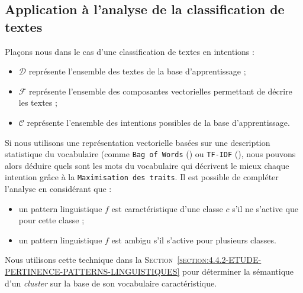 	
	\subsection{Application à l'analyse de la classification de textes}
	\label{annex:C.3.4-DESCRIPTION-IMPLEMENTATION-FEATURES-MAXIMIZATION-METRIC-APPLICATION-TEXTES}
	
		Plaçons nous dans le cas d'une classification de textes en intentions :
		\begin{itemize}
			\item $\mathcal{D}$ représente l'ensemble des textes de la base d'apprentissage ;
			\item $\mathcal{F}$ représente l'ensemble des composantes vectorielles permettant de décrire les textes ;
			\item $\mathcal{C}$ représente l'ensemble des intentions possibles de la base d'apprentissage.
		\end{itemize}
		
		Si nous utilisons une représentation vectorielle basées sur une description statistique du vocabulaire (comme \texttt{Bag of Words} (\cite{harris:1954:distributional-structure}) ou \texttt{TF-IDF} (\cite{ramos:2003:using-tfidf-determine}), nous pouvons alors déduire quels sont les mots du vocabulaire qui décrivent le mieux chaque intention grâce à la \texttt{Maximisation des traits}.
		Il est possible de compléter l'analyse en considérant que :
		\begin{itemize}
			\item un pattern linguistique $f$ est caractéristique d'une classe $c$ s'il ne s'active que pour cette classe ;
			\item un pattern linguistique $f$ est ambigu s'il s'active pour plusieurs classes.
		\end{itemize}
		Nous utilisons cette technique dans la \textsc{Section~\ref{section:4.4.2-ETUDE-PERTINENCE-PATTERNS-LINGUISTIQUES}} pour déterminer la sémantique d'un \textit{cluster} sur la base de son vocabulaire caractéristique.
